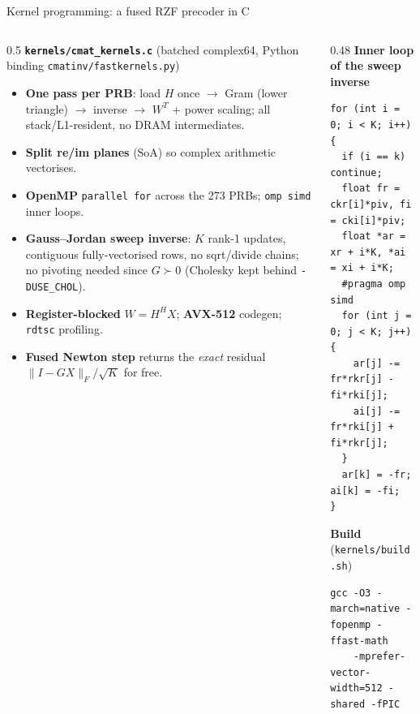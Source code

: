 \documentclass[aspectratio=169,11pt,xcolor=table]{beamer}
\begin{document}
\begin{frame}[fragile]{Kernel programming: a fused RZF precoder in C}
  \scriptsize
  \begin{columns}[T]
    \begin{column}{0.5\textwidth}
      \textbf{\texttt{kernels/cmat\_kernels.c}} (batched complex64, Python binding \texttt{cmatinv/fastkernels.py})
      \begin{itemize}
        \item \textbf{One pass per PRB}: load $H$ once $\to$ Gram (lower triangle) $\to$ inverse $\to$ $W^T$ + power scaling; all stack/L1-resident, no DRAM intermediates.
        \item \textbf{Split re/im planes} (SoA) so complex arithmetic vectorises.
        \item \textbf{OpenMP} \texttt{parallel for} across the 273 PRBs; \texttt{omp simd} inner loops.
        \item \textbf{Gauss--Jordan sweep inverse}: $K$ rank-1 updates, contiguous fully-vectorised rows, no sqrt/divide chains; no pivoting needed since $G \succ 0$ (Cholesky kept behind \texttt{-DUSE\_CHOL}).
        \item \textbf{Register-blocked} $W = H^H X$; \textbf{AVX-512} codegen; \texttt{rdtsc} profiling.
        \item \textbf{Fused Newton step} returns the \emph{exact} residual $\|I - GX\|_F/\sqrt K$ for free.
      \end{itemize}
    \end{column}
    \begin{column}{0.48\textwidth}
      \textbf{Inner loop of the sweep inverse}
\begin{verbatim}
for (int i = 0; i < K; i++) {
  if (i == k) continue;
  float fr = ckr[i]*piv, fi = cki[i]*piv;
  float *ar = xr + i*K, *ai = xi + i*K;
  #pragma omp simd
  for (int j = 0; j < K; j++) {
    ar[j] -= fr*rkr[j] - fi*rki[j];
    ai[j] -= fr*rki[j] + fi*rkr[j];
  }
  ar[k] = -fr; ai[k] = -fi;
}
\end{verbatim}
      \textbf{Build} (\texttt{kernels/build.sh})
\begin{verbatim}
gcc -O3 -march=native -fopenmp -ffast-math
    -mprefer-vector-width=512 -shared -fPIC
\end{verbatim}
    \end{column}
  \end{columns}
\end{frame}
\end{document}
